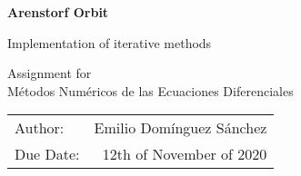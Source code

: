\begin{titlepage}
    \begin{center}
        \vspace*{1cm}
        
        \Huge \textbf{Arenstorf Orbit}
        
        \vspace{0.5cm}
        \LARGE Implementation of iterative methods
        
        \vspace{0.5cm}
        
        \Large Assignment for \\ Métodos Numéricos de las Ecuaciones Diferenciales
        
        \vspace{0.5cm}
   		
        \vfill
        
        \vspace{0.8cm}
        \Large
            \begin{flushright}
              	\begin{tabular}{lr}
                  Author: & Emilio Domínguez Sánchez\\
                  Due Date: & 12th of November of 2020\\
                \end{tabular}
            \end{flushright}
        \vspace{0.5cm}
        
    \end{center}
\end{titlepage}
